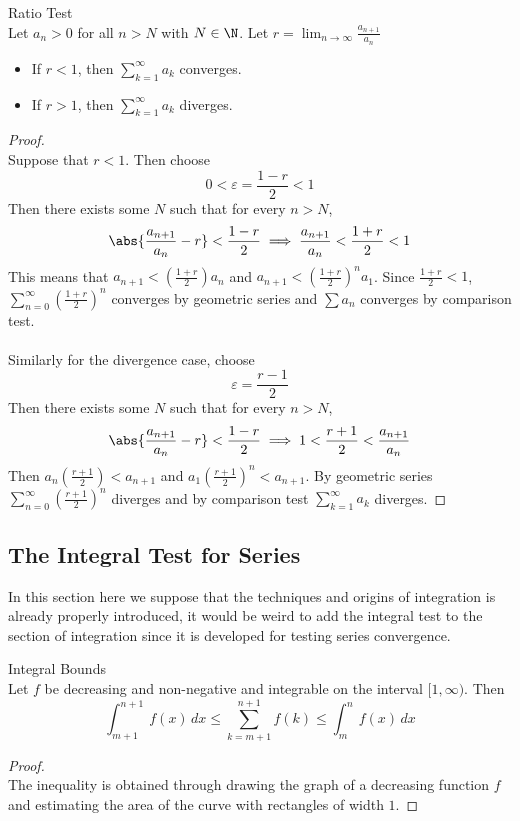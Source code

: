 \documentclass[a4paper]{article}
\begin{document}
\begin{thm}{Ratio Test}{}\\ Let $a_n>0$ for all $n>N$ with $N\in\N$. Let $r=\lim_{n\to\infty}\frac{a_{n+1}}{a_n}$
\begin{itemize} 
\item If $r<1$, then $\sum_{k=1}^\infty a_k$ converges. 
\item If $r>1$, then $\sum_{k=1}^\infty a_k$ diverges. 
\end{itemize} 
\begin{proof}\\ Suppose that $r<1$. Then choose $$0<\varepsilon=\frac{1-r}{2}<1$$ Then there exists some $N$ such that for every $n>N$, $$\abs{\frac{a_{n+1}}{a_n}-r}<\frac{1-r}{2}\implies\frac{a_{n+1}}{a_n}<\frac{1+r}{2}<1$$ This means that $a_{n+1}<(\frac{1+r}{2})a_n$ and $a_{n+1}<(\frac{1+r}{2})^na_1$. Since $\frac{1+r}{2}<1$, $\sum_{n=0}^{\infty}(\frac{1+r}{2})^n$ converges by geometric series and $\sum a_n$ converges by comparison test. \\~\\
Similarly for the divergence case, choose $$\varepsilon=\frac{r-1}{2}$$ Then there exists some $N$ such that for every $n>N$, $$\abs{\frac{a_{n+1}}{a_n}-r}<\frac{1-r}{2}\implies 1<\frac{r+1}{2}<\frac{a_{n+1}}{a_n}$$ Then $a_n(\frac{r+1}{2})<a_{n+1}$ and $a_1(\frac{r+1}{2})^n<a_{n+1}$. By geometric series $\sum_{n=0}^{\infty}(\frac{r+1}{2})^n$ diverges and by comparison test $\sum_{k=1}^\infty a_k$ diverges. 
\end{proof}
\end{thm}

\subsection{The Integral Test for Series}
In this section here we suppose that the techniques and origins of integration is already properly introduced, it would be weird to add the integral test to the section of integration since it is developed for testing series convergence. 
\begin{thm}{Integral Bounds}{}\\ Let $f$ be decreasing and non-negative and integrable on the interval $[1,\infty)$. Then $$\int_{m+1}^{n+1}f(x)\,dx\leq\sum_{k=m+1}^{n+1}f(k)\leq\int_{m}^{n}f(x)\,dx$$ 
\begin{proof}\\ The inequality is obtained through drawing the graph of a decreasing function $f$ and estimating the area of the curve with rectangles of width $1$. 
\end{proof}
\end{thm}
\end{document}
